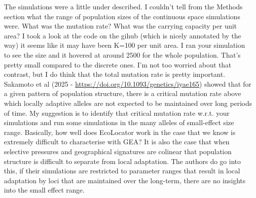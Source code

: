 \begin{point}{} %
The simulations were a little under described. I couldn't tell from the Methods section what the range of population sizes of the continuous space simulations were. What was the mutation rate? What was the carrying capacity per unit area? I took a look at the code on the gihub (which is nicely annotated by the way) it seems like it may have been K=100 per unit area. I ran your simulation to see the size and it hovered at around 2500 for the whole population. That's pretty small compared to the discrete ones. I'm not too worried about that contrast, but I do think that the total mutation rate is pretty important. Sakamoto et al (2025 - \url{https://doi.org/10.1093/genetics/iyae165}) showed that for a given pattern of population structure, there is a critical mutation rate above which locally adaptive alleles are not expected to be maintained over long periods of time. My suggestion is to identify that critical mutation rate w.r.t. your simulations and run some simulations in the many alleles of small-effect size range. Basically, how well does EcoLocator work in the case that we know is extremely difficult to characterise with GEA? It is also the case that when selective pressures and geographical signatures are colinear that population structure is difficult to separate from local adaptation. The authors do go into this, if their simulations are restricted to parameter ranges that result in local adaptation by loci that are maintained over the long-term, there are no insights into the small effect range.
\end{point}


